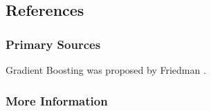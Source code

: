 



\subsection{References}

\subsubsection{Primary Sources}

Gradient Boosting was proposed by Friedman \cite{Friedman2001}.

\subsubsection{More Information}



